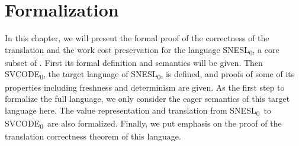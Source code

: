 
\def\fmsnesl{SNESL\textsubscript{0}}
\def\fmsvcode{SVCODE\textsubscript{0}}



\def\seval#1#2#3#4#5{\left\langle#1,#2 \right\rangle \Da^{#3} #4 \ \$ \ #5} 
\def\sevalf#1#2#3#4{{\lcall}(#1,...,#2) \Da^{#3} #4}
\def\sevalfg#1#2#3#4{#1(#2) \Da^{#3} #4}

\def\Eval#1#2#3#4{#1 \Env #2 \Eva #3 \ \$ \ #4 } 


\def\Type#1#2#3{#1 \Env #2 : #3 } 
\def\Typef#1#2#3{#1 : (#2) \rightarrow #3}
\def\TypeV#1#2{#1 : #2}

\def\ValRep#1#2#3{ #1 \mathrel{\triangleright_{#2}} #3}


\def\Vtransb#1#2#3#4{#1 \mathrel{\triangleleft_{#2}} #3,#4}

\def\wf#1#2#3{ #2 \Vdash #1 : #3} %


\def\etail#1#2{\< #1 | #2 \'>}  %

\def\PRName#1{\textsc{I-#1}}
\def\MI{\mathcal{I}}  %

\def\WName#1{\textsc{W-#1}}
\def\MW{\mathcal{W}}

\def\ConEq#1{\xlongequal{#1}}  %



\def\Seql#1{\{ #1_1,...,#1_l \}}

\def\emptyvtau#1{\emptyv_{#1}} 

\chapter{Formalization}


In this chapter, we will present the formal proof of the correctness of the translation and the work cost preservation for the language \fmsnesl, a core subset of \mysnesl.
First its formal definition and semantics will be given.
Then \fmsvcode, the target language of \fmsnesl, is defined, and proofs of some of its properties including freshness and determinism are given.
As the first step to formalize the full language, we only consider the eager semantics of this target language here.
The value representation and translation from \fmsnesl \ to \fmsvcode \ are also formalized.
Finally, we put emphasis on the proof of the translation correctness theorem of this language.



